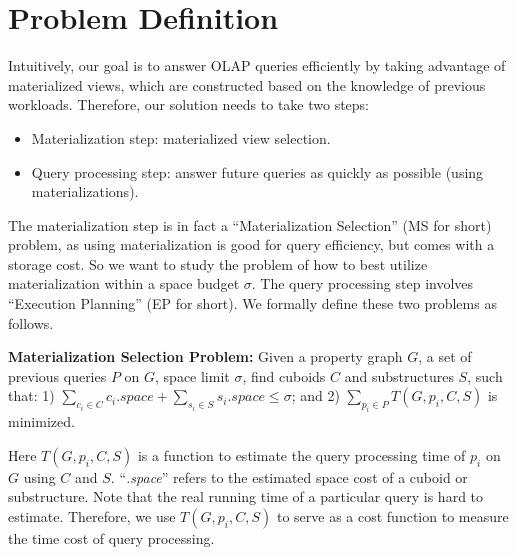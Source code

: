 \section{Problem Definition}
\label{sec:Problem Definition}

Intuitively, our goal is to answer OLAP queries efficiently by taking advantage of materialized views, which are constructed based on the knowledge of previous workloads. Therefore, our solution needs to take two steps:

\begin{itemize}
	\item Materialization step: materialized view selection. 
	\item Query processing step: answer future queries as quickly as possible (using materializations). 
\end{itemize} 

The materialization step is in fact a ``Materialization Selection'' (MS for short) problem, as using materialization is good for query efficiency, but comes with a storage cost. So we want to study the problem of how to best utilize materialization within a space budget $\sigma$.   The query processing step involves ``Execution Planning'' (EP for short). We formally define these two problems as follows.

\noindent\textbf{Materialization Selection Problem:} Given a property graph $G$, a set of previous queries $P$ on $G$, space limit $\sigma$, find cuboids $C$ and substructures $S$, such that: 1) $\displaystyle{\sum_{c_{i}\in C}c_{i}.space} + 
\displaystyle{\sum_{s_{i}\in S}s_{i}.space} 
\leq \sigma
$; and 2) $\displaystyle{\sum_{p_{i}\in P}T(G, p_{i}, C, S)}$  is minimized. 

Here $T(G, p_{i}, C, S)$ is a function to estimate the  query processing time of $p_{i}$ on $G$ using  $C$ and $S$. ``\emph{.space}'' refers to the estimated space cost of a cuboid or substructure. Note that the real running time of a particular query is hard to estimate. Therefore, we use $T(G, p_{i}, C, S)$ to serve as a cost function to measure the time cost of query processing. 


